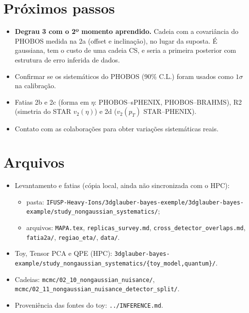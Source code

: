 \documentclass[11pt,a4paper]{article}
\newcommand{\arq}[1]{\texttt{\nolinkurl{#1}}}
\begin{document}
\section{Próximos passos}
\begin{itemize}[nosep]
\item \textbf{Degrau 3 com o 2º momento aprendido.} Cadeia com a covariância do PHOBOS medida na 2a (offset e inclinação), no lugar da suposta.
É gaussiana, tem o custo de uma cadeia CS, e seria a primeira posterior com estrutura de erro inferida de dados.
\item Confirmar se os sistemáticos do PHOBOS (90\% C.L.) foram usados como $1\sigma$ na calibração.
\item Fatias 2b e 2c (forma em $\eta$: PHOBOS--sPHENIX, PHOBOS--BRAHMS), R2 (simetria do STAR $v_2(\eta)$) e 2d ($v_2(p_T)$ STAR--PHENIX).
\item Contato com as colaborações para obter variações sistemáticas reais.
\end{itemize}

\section*{Arquivos}
\small
\begin{itemize}[nosep]
\item Levantamento e fatias (cópia local, ainda não sincronizada com o HPC):
  \begin{itemize}[nosep]
  \item pasta: \arq{IFUSP-Heavy-Ions/3dglauber-bayes-exemple/3dglauber-bayes-example/study_nongaussian_systematics/};
  \item arquivos: \arq{MAPA.tex}, \arq{replicas_survey.md}, \arq{cross_detector_overlaps.md}, \arq{fatia2a/}, \arq{regiao_eta/}, \arq{data/}.
  \end{itemize}
\item Toy, Tensor PCA e QPE (HPC): \arq{3dglauber-bayes-example/study_nongaussian_systematics/\{toy_model,quantum\}/}.
\item Cadeias: \arq{mcmc/02_10_nongaussian_nuisance/}, \arq{mcmc/02_11_nongaussian_nuisance_detector_split/}.
\item Proveniência das fontes do toy: \arq{../INFERENCE.md}.
\end{itemize}
\end{document}
